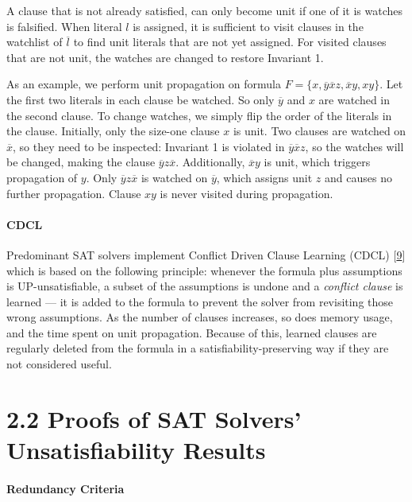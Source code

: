 \documentclass[
]{report}
\begin{document}
A clause that is not already satisfied, can only become unit if one of
it is watches is falsified. When literal \(l\) is assigned, it is
sufficient to visit clauses in the watchlist of \(\overline{l}\) to find
unit literals that are not yet assigned. For visited clauses that are
not unit, the watches are changed to restore Invariant 1.

As an example, we perform unit propagation on formula
\(F = \{x, \overline{y}\overline{x}z, \overline{x}y, xy\}\). Let the
first two literals in each clause be watched. So only \(\overline{y}\)
and \(x\) are watched in the second clause. To change watches, we simply
flip the order of the literals in the clause. Initially, only the
size-one clause \(x\) is unit. Two clauses are watched on
\(\overline{x}\), so they need to be inspected: Invariant 1 is violated
in \(\overline{y}\overline{x}z\), so the watches will be changed, making
the clause \(\overline{y}z\overline{x}\). Additionally,
\(\overline{x}y\) is unit, which triggers propagation of \(y\). Only
\(\overline{y}z\overline{x}\) is watched on \(\overline{y}\), which
assigns unit \(z\) and causes no further propagation. Clause \(xy\) is
never visited during propagation.

\paragraph{CDCL}

Predominant SAT solvers implement Conflict Driven Clause Learning (CDCL)
{[}\protect\hyperlink{ref-DBLP:seriesux2ffaiaux2fSilvaLM09}{9}{]} which
is based on the following principle: whenever the formula plus
assumptions is UP-unsatisfiable, a subset of the assumptions is undone
and a \emph{conflict clause} is learned --- it is added to the formula
to prevent the solver from revisiting those wrong assumptions. As the
number of clauses increases, so does memory usage, and the time spent on
unit propagation. Because of this, learned clauses are regularly deleted
from the formula in a satisfiability-preserving way if they are not
considered useful.

\hypertarget{proofs-of-sat-solvers-unsatisfiability-results}{%
\section{2.2 Proofs of SAT Solvers' Unsatisfiability
Results}\label{proofs-of-sat-solvers-unsatisfiability-results}}

\paragraph{Redundancy Criteria}
\end{document}

